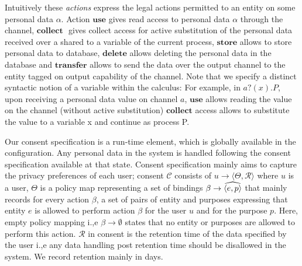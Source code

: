 Intuitively these \emph{actions} express the legal actions permitted to an entity on some personal data $ \alpha $. Action $ \textbf{use}$ gives read access to personal data $ \alpha $ through the channel, $ \textbf{collect }$ gives collect access for active substitution of the personal data received over a shared to a variable of the current process, $ \textbf{store}$ allows to store personal data to database, $ \textbf{delete}$ allows deleting the personal data in the database and $\textbf{transfer}$ allows to send the data over the output channel to the entity tagged on output capability of the channel.  Note that we specify a distinct syntactic notion of a variable within the calculus: For example, in $ a?(x).P $, upon receiving a personal data value on channel $ a$, $ \textbf{use}$ allows reading the value on the channel (without active substitution) $ \textbf{collect}$ access allows to substitute the value to a variable x and continue as process P.

Our consent specification is a run-time element, which is globally available in the configuration. Any personal data in the system is handled following the consent specification available at that state. 
Consent specification mainly aims to capture the privacy preferences of each user; consent $ \mathcal{C} $ consists of $ u \rightarrow \langle \Theta, \mathcal{R} \rangle   $
where $ u$ is a user, $ \Theta $ is a policy map representing a set of bindings $ \beta \rightarrow  \widehat{\langle e, p \rangle} $ that mainly records for every action $ \beta $, a set of pairs of entity and purposes expressing that entity $ e $ is allowed to perform action $ \beta $ for the user $ u$ and for the purpose $ p$. Here, empty policy mapping i.,e  $ \beta \rightarrow \emptyset $ states that no entity or purposes are allowed to perform this action. 
$\mathcal{R} $ in consent is the retention time of the data specified by the user i.,e any data handling post retention time should be disallowed in the system. We record retention mainly in days.
